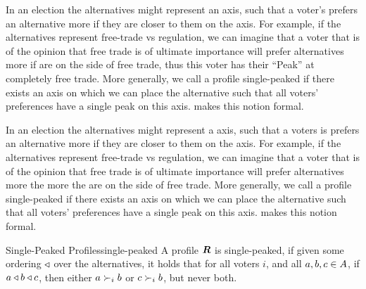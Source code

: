 In an election the alternatives might represent an axis, such that a voter's
prefers an alternative more if they are closer to them on the axis. For
example, if the alternatives represent free-trade vs regulation, we can imagine
that a voter that is of the opinion that free trade is of ultimate importance
will prefer alternatives more if are on the side of free trade, thus this voter has their ``Peak'' at completely free trade. More generally,
we call a profile single-peaked if there exists an axis on which we can place
the alternative such that all voters' preferences have a single peak on this
axis.  makes this notion formal.

In an election the alternatives might represent a axis, such that a voters is prefers an alternative more if they are closer to them on the axis. For example, if the alternatives represent free-trade vs regulation, we can imagine that a voter that is of the opinion that free trade is of ultimate importance will prefer alternatives more the more the are on the side of free trade. More generally, we call a profile single-peaked if there exists an axis on which we can place the alternative such that all voters' preferences have a single peak on this axis.  makes this notion formal.

\begin{definition}{Single-Peaked Profiles}{single-peaked}
	A profile $\boldsymbol{R}$ is single-peaked, if given some ordering $\triangleleft$ over the alternatives, it holds that for all voters $i$, and all $a, b, c \in A$, if $a \triangleleft b \triangleleft c$, then either $a \succ_i b$ or $c \succ_i b$, but never both.
\end{definition}




